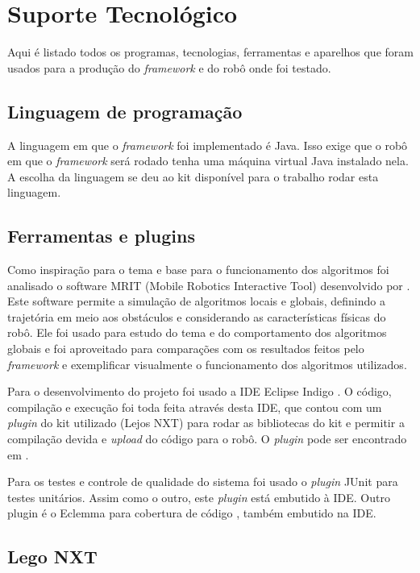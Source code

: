 \chapter[Suporte Tecnológico]{Suporte Tecnológico}

Aqui é listado todos os programas, tecnologias, ferramentas e aparelhos que foram usados para a produção do \textit{framework} e do robô onde foi testado. 

\section{Linguagem de programação}

A linguagem em que o \textit{framework} foi implementado é Java. Isso exige que o robô em que o \textit{framework} será rodado tenha uma máquina virtual Java instalado nela. A escolha da linguagem se deu ao kit disponível para o trabalho rodar esta linguagem.

\section{Ferramentas e plugins}

Como inspiração para o tema e base para o funcionamento dos algoritmos foi analisado o software MRIT (Mobile Robotics Interactive Tool) \cite{MRIT_SITE} desenvolvido por \cite{Guzman2008}. Este software permite a simulação de algoritmos locais e globais, definindo a trajetória em meio aos obstáculos e considerando as características físicas do robô. Ele foi usado para estudo do tema e do comportamento dos algoritmos globais e foi aproveitado para comparações com os resultados feitos pelo \textit{framework} e exemplificar visualmente o funcionamento dos algoritmos utilizados.

Para o desenvolvimento do projeto foi usado a IDE Eclipse Indigo \cite{ECLIPSE_SITE}. O código, compilação e execução foi toda feita através desta IDE, que contou com um \textit{plugin} do kit utilizado (Lejos NXT) para rodar as bibliotecas do kit e permitir a compilação devida e \textit{upload} do código para o robô. O \textit{plugin} pode ser encontrado em \cite{PLUGIN_NXT_SITE}.

Para os testes e controle de qualidade do sistema foi usado o \textit{plugin} JUnit \cite{JUNIT_SITE} para testes unitários. Assim como o outro, este \textit{plugin} está embutido à IDE. Outro plugin é o Eclemma para cobertura de código \cite{ECLEMMA_SITE}, também embutido na IDE.

\section{Lego NXT}

